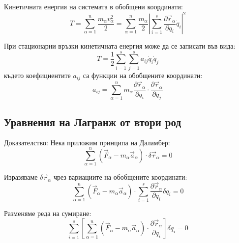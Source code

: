 \documentclass{report}
\begin{document}
Кинетичната енергия на системата в обобщени координати:
\begin{equation}
T = \sum_{\alpha=1}^{n} \frac{m_\alpha v_\alpha^2}{2} = \sum_{\alpha=1}^{n} \frac{m_\alpha}{2} \left| \sum_{i=1}^{s} \frac{\partial \vec{r}_\alpha}{\partial q_i} \dot{q}_i \right|^2
\end{equation}

При стационарни връзки кинетичната енергия може да се записати във вида:
\begin{equation}
T = \frac{1}{2} \sum_{i=1}^{s} \sum_{j=1}^{s} a_{ij} \dot{q}_i \dot{q}_j
\end{equation}
където коефициентите $a_{ij}$ са функции на обобщените координати:
\begin{equation}
a_{ij} = \sum_{\alpha=1}^{n} m_\alpha \frac{\partial \vec{r}_\alpha}{\partial q_i} \cdot \frac{\partial \vec{r}_\alpha}{\partial q_j}
\end{equation}


\subsection{Уравнения на Лагранж от втори род}


Доказателство: Нека приложим принципа на Даламбер:
\begin{equation}
\sum_{\alpha=1}^{n} (\vec{F}_\alpha - m_\alpha \vec{a}_\alpha) \cdot \delta \vec{r}_\alpha = 0
\end{equation}

Изразяваме $\delta \vec{r}_\alpha$ чрез вариациите на обобщените координати:
\begin{equation}
\sum_{\alpha=1}^{n} (\vec{F}_\alpha - m_\alpha \vec{a}_\alpha) \cdot \sum_{i=1}^{s} \frac{\partial \vec{r}_\alpha}{\partial q_i} \delta q_i = 0
\end{equation}

Разменяме реда на сумиране:
\begin{equation}
\sum_{i=1}^{s} \left[ \sum_{\alpha=1}^{n} (\vec{F}_\alpha - m_\alpha \vec{a}_\alpha) \cdot \frac{\partial \vec{r}_\alpha}{\partial q_i} \right] \delta q_i = 0
\end{equation}
\end{document}
